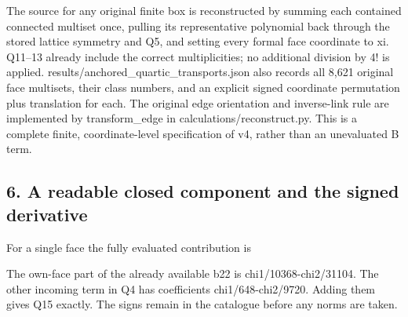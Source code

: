 \documentclass[11pt,a4paper]{article}
\renewcommand{\[}{\begingroup\small\originaldisplaystart}
\renewcommand{\]}{\originaldisplayend\endgroup}
\begin{document}
The source for any original finite box is reconstructed by summing each
contained connected multiset once, pulling its representative polynomial
back through the stored lattice symmetry and Q5, and setting every
formal face coordinate to xi. Q11--13 already include the correct
multiplicities; no additional division by 4! is applied.
{\ttfamily r\allowbreak{}e\allowbreak{}s\allowbreak{}u\allowbreak{}l\allowbreak{}t\allowbreak{}s\allowbreak{}/\allowbreak{}a\allowbreak{}n\allowbreak{}c\allowbreak{}h\allowbreak{}o\allowbreak{}r\allowbreak{}e\allowbreak{}d\allowbreak{}\_\allowbreak{}q\allowbreak{}u\allowbreak{}a\allowbreak{}r\allowbreak{}t\allowbreak{}i\allowbreak{}c\allowbreak{}\_\allowbreak{}t\allowbreak{}r\allowbreak{}a\allowbreak{}n\allowbreak{}s\allowbreak{}p\allowbreak{}o\allowbreak{}r\allowbreak{}t\allowbreak{}s\allowbreak{}.\allowbreak{}j\allowbreak{}s\allowbreak{}o\allowbreak{}n\allowbreak{}}
also records all 8,621 original face multisets, their class numbers, and
an explicit signed coordinate permutation plus translation for each. The
original edge orientation and inverse-link rule are implemented by
{\ttfamily t\allowbreak{}r\allowbreak{}a\allowbreak{}n\allowbreak{}s\allowbreak{}f\allowbreak{}o\allowbreak{}r\allowbreak{}m\allowbreak{}\_\allowbreak{}e\allowbreak{}d\allowbreak{}g\allowbreak{}e\allowbreak{}}
in
{\ttfamily c\allowbreak{}a\allowbreak{}l\allowbreak{}c\allowbreak{}u\allowbreak{}l\allowbreak{}a\allowbreak{}t\allowbreak{}i\allowbreak{}o\allowbreak{}n\allowbreak{}s\allowbreak{}/\allowbreak{}r\allowbreak{}e\allowbreak{}c\allowbreak{}o\allowbreak{}n\allowbreak{}s\allowbreak{}t\allowbreak{}r\allowbreak{}u\allowbreak{}c\allowbreak{}t\allowbreak{}.\allowbreak{}p\allowbreak{}y\allowbreak{}}.
This is a complete finite, coordinate-level specification of v4, rather
than an unevaluated B term.

\subsection{6. A readable closed component and the signed
derivative}\label{a-readable-closed-component-and-the-signed-derivative}

For a single face the fully evaluated contribution is

\[
\] The own-face part of the already available b22 is
{\ttfamily c\allowbreak{}h\allowbreak{}i\allowbreak{}1\allowbreak{}/\allowbreak{}1\allowbreak{}0\allowbreak{}3\allowbreak{}6\allowbreak{}8\allowbreak{}-\allowbreak{}c\allowbreak{}h\allowbreak{}i\allowbreak{}2\allowbreak{}/\allowbreak{}3\allowbreak{}1\allowbreak{}1\allowbreak{}0\allowbreak{}4\allowbreak{}}.
The other incoming term in Q4 has coefficients
{\ttfamily c\allowbreak{}h\allowbreak{}i\allowbreak{}1\allowbreak{}/\allowbreak{}6\allowbreak{}4\allowbreak{}8\allowbreak{}-\allowbreak{}c\allowbreak{}h\allowbreak{}i\allowbreak{}2\allowbreak{}/\allowbreak{}9\allowbreak{}7\allowbreak{}2\allowbreak{}0\allowbreak{}}.
Adding them gives Q15 exactly. The signs remain in the catalogue before
any norms are taken.
\end{document}
